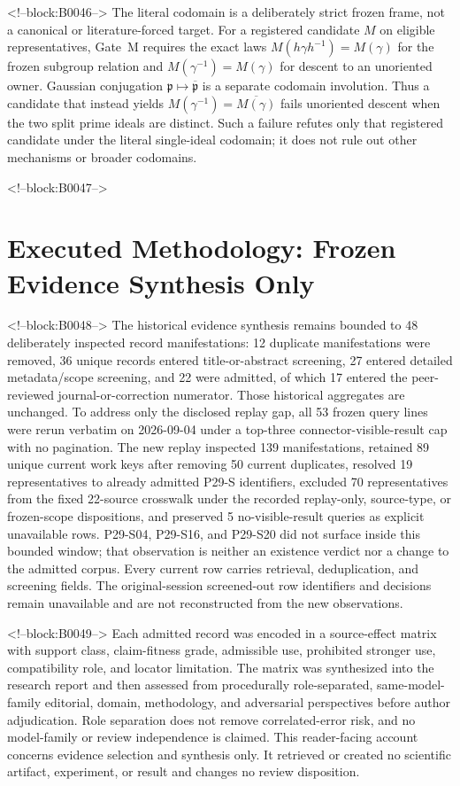 \documentclass[11pt,a4paper]{article}
\begin{document}
<!--block:B0046-->
The literal codomain is a deliberately strict frozen frame, not a canonical or literature-forced target. For a registered candidate \(M\) on eligible representatives, Gate~M requires the exact laws \(M(h\gamma h^{-1})=M(\gamma)\) for the frozen subgroup relation and \(M(\gamma^{-1})=M(\gamma)\) for descent to an unoriented owner. Gaussian conjugation \(\mathfrak p\mapsto\overline{\mathfrak p}\) is a separate codomain involution. Thus a candidate that instead yields \(M(\gamma^{-1})=\overline{M(\gamma)}\) fails unoriented descent when the two split prime ideals are distinct. Such a failure refutes only that registered candidate under the literal single-ideal codomain; it does not rule out other mechanisms or broader codomains.

<!--block:B0047-->
\section{Executed Methodology: Frozen Evidence Synthesis Only}

<!--block:B0048-->
The historical evidence synthesis remains bounded to 48 deliberately inspected record manifestations: 12 duplicate manifestations were removed, 36 unique records entered title-or-abstract screening, 27 entered detailed metadata/scope screening, and 22 were admitted, of which 17 entered the peer-reviewed journal-or-correction numerator. Those historical aggregates are unchanged. To address only the disclosed replay gap, all 53 frozen query lines were rerun verbatim on 2026-09-04 under a top-three connector-visible-result cap with no pagination. The new replay inspected 139 manifestations, retained 89 unique current work keys after removing 50 current duplicates, resolved 19 representatives to already admitted P29-S identifiers, excluded 70 representatives from the fixed 22-source crosswalk under the recorded replay-only, source-type, or frozen-scope dispositions, and preserved 5 no-visible-result queries as explicit unavailable rows. P29-S04, P29-S16, and P29-S20 did not surface inside this bounded window; that observation is neither an existence verdict nor a change to the admitted corpus. Every current row carries retrieval, deduplication, and screening fields. The original-session screened-out row identifiers and decisions remain unavailable and are not reconstructed from the new observations.

<!--block:B0049-->
Each admitted record was encoded in a source-effect matrix with support class, claim-fitness grade, admissible use, prohibited stronger use, compatibility role, and locator limitation. The matrix was synthesized into the research report and then assessed from procedurally role-separated, same-model-family editorial, domain, methodology, and adversarial perspectives before author adjudication. Role separation does not remove correlated-error risk, and no model-family or review independence is claimed. This reader-facing account concerns evidence selection and synthesis only. It retrieved or created no scientific artifact, experiment, or result and changes no review disposition.
\end{document}
